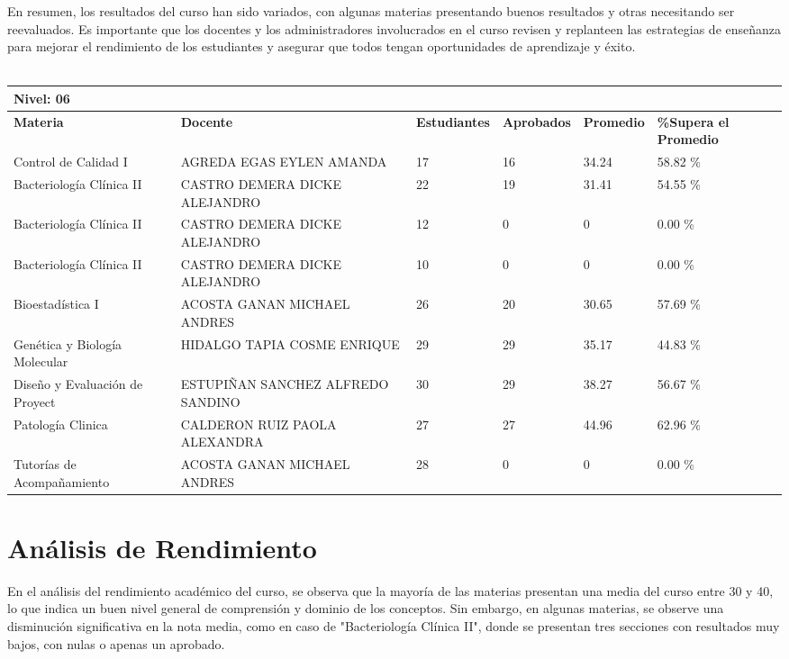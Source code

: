 En resumen, los resultados del curso han sido variados, con algunas materias presentando buenos resultados y otras necesitando ser reevaluados. Es importante que los docentes y los administradores involucrados en el curso revisen y replanteen las estrategias de enseñanza para mejorar el rendimiento de los estudiantes y asegurar que todos tengan oportunidades de aprendizaje y éxito.\\
\vspace{1cm}\\\small
\begin{tabularx}{\textwidth}{|p{2.5cm}|p{2.5cm}|X|X|X|X|}
\hline
\multicolumn{6}{|X|}{\textbf{Nivel: 06 }}\\\hline\textbf{Materia} & \textbf{Docente} & \textbf{Estudiantes} & \textbf{Aprobados} & \textbf{Promedio} & \textbf{\%Supera el Promedio} \\ \hline
Control de Calidad I & AGREDA EGAS EYLEN AMANDA & 17 & 16 & 34.24 & 58.82 \%\\ \hline
Bacteriología Clínica II & CASTRO DEMERA DICKE ALEJANDRO & 22 & 19 & 31.41 & 54.55 \%\\ \hline
Bacteriología Clínica II & CASTRO DEMERA DICKE ALEJANDRO & 12 & 0 & 0 & 0.00 \%\\ \hline
Bacteriología Clínica II & CASTRO DEMERA DICKE ALEJANDRO & 10 & 0 & 0 & 0.00 \%\\ \hline
Bioestadística I & ACOSTA GANAN MICHAEL ANDRES & 26 & 20 & 30.65 & 57.69 \%\\ \hline
Genética y Biología Molecular & HIDALGO TAPIA COSME ENRIQUE & 29 & 29 & 35.17 & 44.83 \%\\ \hline
Diseño y Evaluación de Proyect & ESTUPIÑAN SANCHEZ ALFREDO SANDINO & 30 & 29 & 38.27 & 56.67 \%\\ \hline
Patología Clinica & CALDERON RUIZ PAOLA ALEXANDRA & 27 & 27 & 44.96 & 62.96 \%\\ \hline
Tutorías de Acompañamiento & ACOSTA GANAN MICHAEL ANDRES & 28 & 0 & 0 & 0.00 \%\\ \hline
\end{tabularx}

\vspace{1cm}
\section{Análisis de Rendimiento}
En el análisis del rendimiento académico del curso, se observa que la mayoría de las materias presentan una media del curso entre 30 y 40, lo que indica un buen nivel general de comprensión y dominio de los conceptos. Sin embargo, en algunas materias, se observe una disminución significativa en la nota media, como en caso de "Bacteriología Clínica II", donde se presentan tres secciones con resultados muy bajos, con nulas o apenas un aprobado.

